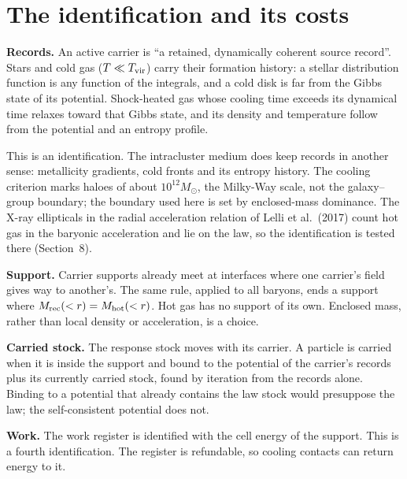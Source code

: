 \documentclass[11pt]{article}
\begin{document}
\section{The identification and its costs}
\textbf{Records.} An active carrier is ``a retained, dynamically coherent source
record''. Stars and cold gas ($T\ll T_{\rm vir}$) carry their formation history: a
stellar distribution function is any function of the integrals, and a cold disk is far
from the Gibbs state of its potential. Shock-heated gas whose cooling time exceeds its
dynamical time relaxes toward that Gibbs state, and its density and temperature follow
from the potential and an entropy profile.

This is an identification. The intracluster medium does keep records in another sense:
metallicity gradients, cold fronts and its entropy history. The cooling criterion marks
haloes of about $10^{12}M_\odot$, the Milky-Way scale, not the galaxy--group boundary;
the boundary used here is set by enclosed-mass dominance. The X-ray ellipticals in the
radial acceleration relation of Lelli et al.\ (2017) count hot gas in the baryonic
acceleration and lie on the law, so the identification is tested there (Section~8).

\textbf{Support.} Carrier supports already meet at interfaces where one carrier's field
gives way to another's. The same rule, applied to all baryons, ends a support where
$M_{\rm rec}(<r)=M_{\rm hot}(<r)$. Hot gas has no support of its own. Enclosed mass,
rather than local density or acceleration, is a choice.

\textbf{Carried stock.} The response stock moves with its carrier. A particle is carried
when it is inside the support and bound to the potential of the carrier's records plus
its currently carried stock, found by iteration from the records alone. Binding to a
potential that already contains the law stock would presuppose the law; the
self-consistent potential does not.

\textbf{Work.} The work register is identified with the cell energy of the support.
This is a fourth identification. The register is refundable, so cooling contacts can
return energy to it.
\end{document}
